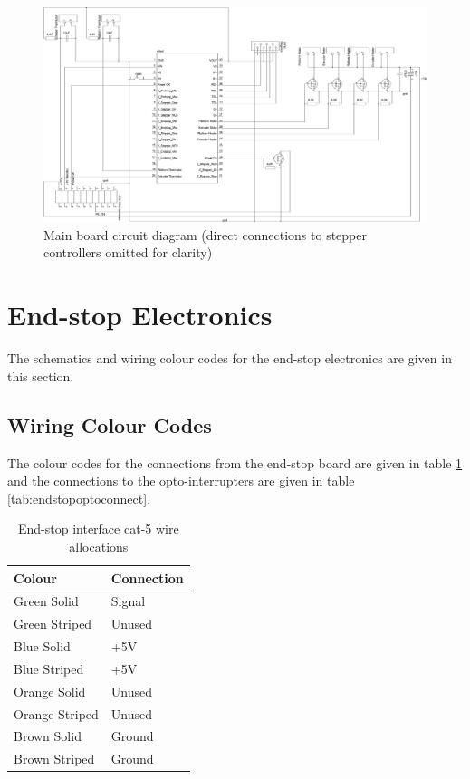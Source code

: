 			\begin{landscape}
				\begin{figure}
					\includegraphics[width=1.5\textheight]{circuits/electronics.pdf}
					\caption{Main board circuit diagram (direct connections to stepper controllers
					         omitted for clarity)}
					\label{fig:electronics}
				\end{figure}
			\end{landscape}
	
	\section{End-stop Electronics}
		
		The schematics and wiring colour codes for the end-stop electronics are
		given in this section.
		
		\subsection{Wiring Colour Codes}
			
			The colour codes for the connections from the end-stop board are given in
			table \ref{tab:endstopinterface} and the connections to the
			opto-interrupters are given in table \ref{tab:endstopoptoconnect}.
			
			\begin{table}[p]
				\centering
				\begin{tabular}{l l}
					\toprule
					Colour & Connection \\
					\midrule
					Green Solid    & Signal \\
					Green Striped  & Unused \\
					Blue Solid     & +5V \\
					Blue Striped   & +5V \\
					Orange Solid   & Unused \\
					Orange Striped & Unused \\
					Brown Solid    & Ground \\
					Brown Striped  & Ground \\
					\bottomrule
				\end{tabular}
				
				\caption{End-stop interface cat-5 wire allocations \cite{endstop}}
				\label{tab:endstopinterface}
			\end{table}
			
